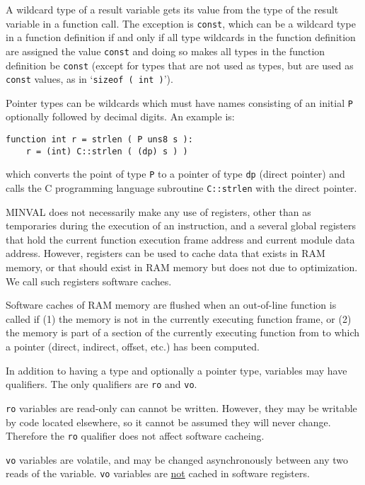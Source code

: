 \documentclass[12pt]{article}
\newenvironment{indpar}[1][0.3in]%
	{\begin{list}{}%
		     {\setlength{\itemsep}{0in}%
		      \setlength{\topsep}{0in}%
		      \setlength{\parsep}{1ex}%
		      \setlength{\labelwidth}{#1}%
		      \setlength{\leftmargin}{#1}%
		      \addtolength{\leftmargin}{\labelsep}}%
	 \item}%
	{\end{list}}
\begin{document}
A wildcard type of a result variable gets its value from the
type of the result variable in a function call.  The exception
is {\tt const}, which can be a wildcard type in a function
definition if and only if all type wildcards in the function definition
are assigned the value {\tt const} and doing so makes
all types in the function definition be {\tt const}
(except for types that are not used as types, but are used as
{\tt const} values, as in `{\tt sizeof ( int )}').

Pointer types can be wildcards which must have names consisting
of an initial {\tt P} optionally followed by decimal digits.
An example is:

\begin{indpar}\begin{verbatim}
function int r = strlen ( P uns8 s ):
    r = (int) C::strlen ( (dp) s ) )
\end{verbatim}\end{indpar}

which converts the point of type {\tt P} to a pointer of
type {\tt dp} (direct pointer) and calls the C programming
language subroutine {\tt C::strlen} with the direct pointer.

MINVAL does not necessarily make any use of registers, other
than as temporaries during the execution of an instruction,
and a several global registers that hold the current function
execution frame address and current module data address.
However, registers can be used to cache data that exists in
RAM memory, or that should exist in RAM memory but does not
due to optimization.  We call such registers software
caches.

Software caches of RAM memory are flushed when an out-of-line
function is called if (1) the memory is not in the currently
executing function frame, or (2) the memory is part of a
section of the currently executing function from to which
a pointer (direct, indirect, offset, etc.) has been computed.

In addition to having a type and optionally a pointer type,
variables may have qualifiers.  The only qualifiers are
{\tt ro} and {\tt vo}.

{\tt ro} variables are read-only
can cannot be written.  However, they may be writable by
code located elsewhere, so it cannot be assumed they will
never change.  Therefore the {\tt ro} qualifier does not
affect software cacheing.

{\tt vo} variables are volatile, and may be changed asynchronously
between any two reads of the variable.  {\tt vo} variables are
\underline{not} cached in software registers.






\printindex
\end{document}
